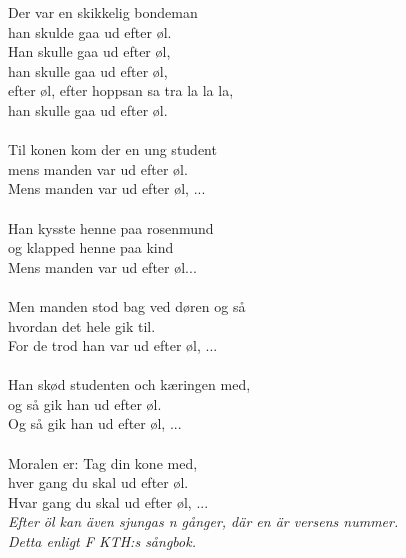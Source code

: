\vspace{10pt}
\revrpt Der var en skikkelig bondeman\\
han skulde gaa ud efter øl.\rpt\\
Han skulle gaa ud efter øl,\\
han skulle gaa ud efter øl,\\
efter øl, efter hoppsan sa tra la la la,\\
han skulle gaa ud efter øl.\\
\\
\revrpt Til konen kom der en ung student\\
mens manden var ud efter øl.\rpt\\
Mens manden var ud efter øl, ...\\
\\
\revrpt Han kysste henne paa rosenmund\\
og klapped henne paa kind\rpt\\
Mens manden var ud efter øl...\\
\\
\revrpt Men manden stod bag ved døren og så\\
hvordan det hele gik til.\rpt\\
For de trod han var ud efter øl, ...\\
\\
\revrpt Han skød studenten och kæringen med,\\
og så gik han ud efter øl.\rpt\\
Og så gik han ud efter øl, ...\\
\\
\revrpt Moralen er: Tag din kone med,\\
hver gang du skal ud efter øl.\rpt\\
Hvar gang du skal ud efter øl, ...\\
\vspace{10pt}
{\footnotesize\textit{Efter öl kan även sjungas n gånger, där en är versens nummer.\\
Detta enligt F KTH:s sångbok.}}
